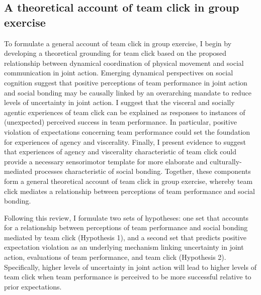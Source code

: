 \begin{CJK}{UTF8}{gbsn}




\section{A theoretical account of team click in group exercise}

To formulate a general account of team click in group exercise, I begin by developing a theoretical grounding for team click based on the proposed relationship between dynamical coordination of physical movement and social communication in joint action.  Emerging dynamical perspectives on social cognition suggest that positive perceptions of team performance in joint action and social bonding may be causally linked by an overarching mandate to reduce levels of uncertainty in joint action.  I suggest that the visceral and socially agentic experiences of team click can be explained as responses to instances of (unexpected) perceived success in team performance.  In particular, positive violation of expectations concerning team performance could set the foundation for experiences of agency and viscerality.  Finally, I present evidence to suggest that experiences of agency and viscerality characteristic of team click could provide a necessary sensorimotor template for more elaborate and culturally-mediated processes characteristic of social bonding.  Together, these components form a general theoretical account of team click in group exercise, whereby team click mediates a relationship between perceptions of team performance and social bonding.

Following this review, I formulate two sets of hypotheses: one set that accounts for a relationship between perceptions of team performance and social bonding mediated by team click (Hypothesis 1), and a second set that predicts positive expectation violation as an underlying mechanism linking uncertainty in joint action, evaluations of team performance, and team click (Hypothesis 2).  Specifically, higher levels of uncertainty in joint action will lead to higher levels of team click when team performance is perceived to be more successful relative to prior expectations.





\end{CJK}
